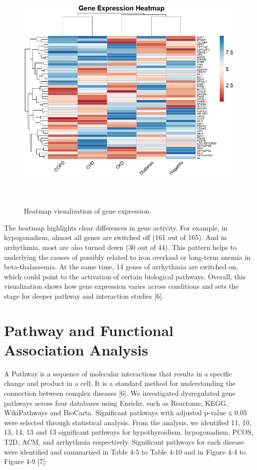 \begin{figure}[H]
\centering
\includegraphics[height=12cm]{./fig/fig4_3.jpg} 
\centering
\caption{Heatmap visualization of gene expression.}
\label{Heatmap}
\end{figure}

The heatmap highlights clear differences in gene activity. For example, in hypogonadism, almost all genes are switched off (161 out of 165). And in arrhythmia, most are also turned down (30 out of 44). This pattern helps to underlying the causes of possibly related to iron overload or long-term anemia in beta-thalassemia. At the same time, 14 genes of arrhythmia are switched on, which could point to the activation of certain biological pathways. Overall, this visualization shows how gene expression varies across conditions and sets the stage for deeper pathway and interaction studies [6].


\section{Pathway and Functional Association Analysis}
\label{sec:sec4_3_3}

A Pathway is a sequence of molecular interactions that results in a specific change and product in a cell. It is a standard method for understanding the connection between complex diseases [6]. We investigated dysregulated gene pathways across four databases using Enrichr, such as Reactome, KEGG, WikiPathways and BioCarta. Significant pathways with adjusted p-value ≤ 0.05 were selected through statistical analysis.
From the analysis, we identified 11, 10, 13, 14, 13 and 13 significant pathways for hypothyroidism, hypogonadism, PCOS, T2D, ACM, and arrhythmia respectively. Significant pathways for each disease were identified and summarized in Table 4-5 to Table 4-10 and in Figure 4-4 to Figure 4-9 [7]:\\

